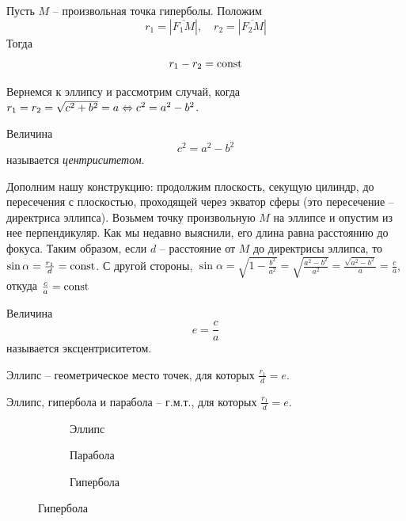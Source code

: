 \begin{Property}
	Пусть $M$ -- произвольная точка гиперболы. Положим
	\[r_1 = |\overline{F_1 M}|, \quad r_2 = |\overline{F_2 M}|\]
	Тогда
	\[r_1 - r_2 = \operatorname{const}\]

	\begin{figure}[H]
		\centering
		\def\svgwidth{.25\columnwidth}
		
	\end{figure}
\end{Property}

Вернемся к эллипсу и рассмотрим случай, когда $r_1 = r_2 = \sqrt{c^2 + b^2} = a \Leftrightarrow c^2 = a^2 - b^2$.

\begin{Def}
	Величина
	\[c^2 = a^2 - b^2\]
	называется \textit{центриситетом}.
\end{Def}

Дополним нашу конструкцию:
продолжим плоскость, секущую цилиндр, до пересечения с плоскостью, проходящей через экватор сферы (это пересечение -- директриса эллипса).
Возьмем точку произвольную $M$ на эллипсе и опустим из нее перпендикуляр. Как мы недавно выяснили, его длина равна расстоянию до фокуса.
Таким образом, если $d$ -- расстояние от $M$ до директрисы эллипса, то $\sin \alpha = \frac{r_1}{d} = \operatorname{const}$. С другой стороны,
$\sin \alpha = \sqrt{1 - \frac{b^2}{a^2}} = \sqrt{ \frac{a^2 - b^2}{a^2}} = \frac{\sqrt{a^2 - b^2}}{a} = \frac{c}{a}$, откуда $\frac{c}{a} = \operatorname{const}$ 

\begin{Def}
	Величина 
	\[e = \frac{c}{a}\]
	называется эксцентриситетом.
\end{Def}

\begin{Property}
	Эллипс -- геометрическое место точек, для которых $\frac{r_1}{d} = e$. 
\end{Property}

\begin{Rem}
	Эллипс, гипербола и парабола -- г.м.т., для которых $\frac{r_1}{d} = e$.

	\begin{figure}[H]
		\centering

		\begin{subfigure}[b]{.3\textwidth}
			\centering
			\def\svgwidth{\columnwidth}
			
			\caption{Эллипс}
		\end{subfigure}
		\hfill
		\begin{subfigure}[b]{.3\textwidth}
			\centering
			\def\svgwidth{.6\columnwidth}
			
			\caption{Парабола}
		\end{subfigure}
		\hfill
		\begin{subfigure}[b]{.3\textwidth}
			\centering
			\def\svgwidth{.8\columnwidth}
			
			\caption{Гипербола}
		\end{subfigure}
	\end{figure}
\end{Rem}


